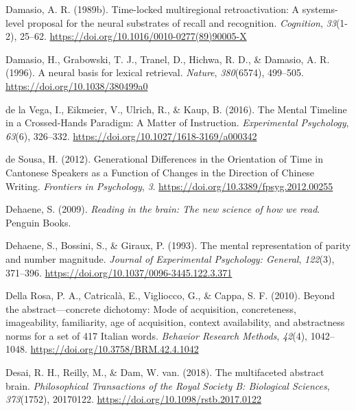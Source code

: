 \documentclass[
  a4paper,12pt,twoside,onecolumn,openright,final,oldfontcommands]{memoir}
\newlength{\cslhangindent}
\newlength{\cslentryspacingunit} %
\newenvironment{CSLReferences}[2] %
 {%
  \setlength{\parindent}{0pt}
  \ifodd #1
  \let\oldpar\par
  \def\par{\hangindent=\cslhangindent\oldpar}
  \fi
  \setlength{\parskip}{#2\cslentryspacingunit}
 }%
 {}
\begin{document}
\begin{CSLReferences}{1}{0}
\leavevmode{}%
Damasio, A. R. (1989b). Time-locked multiregional retroactivation: {A} systems-level proposal for the neural substrates of recall and recognition. \emph{Cognition}, \emph{33}(1-2), 25--62. \url{https://doi.org/10.1016/0010-0277(89)90005-X}

\leavevmode{}%
Damasio, H., Grabowski, T. J., Tranel, D., Hichwa, R. D., \& Damasio, A. R. (1996). A neural basis for lexical retrieval. \emph{Nature}, \emph{380}(6574), 499--505. \url{https://doi.org/10.1038/380499a0}

\leavevmode{}%
de la Vega, I., Eikmeier, V., Ulrich, R., \& Kaup, B. (2016). The {Mental} {Timeline} in a {Crossed}-{Hands} {Paradigm}: {A} {Matter} of {Instruction}. \emph{Experimental Psychology}, \emph{63}(6), 326--332. \url{https://doi.org/10.1027/1618-3169/a000342}

\leavevmode{}%
de Sousa, H. (2012). Generational {Differences} in the {Orientation} of {Time} in {Cantonese} {Speakers} as a {Function} of {Changes} in the {Direction} of {Chinese} {Writing}. \emph{Frontiers in Psychology}, \emph{3}. \url{https://doi.org/10.3389/fpsyg.2012.00255}

\leavevmode{}%
Dehaene, S. (2009). \emph{Reading in the brain: The new science of how we read}. Penguin Books.

\leavevmode{}%
Dehaene, S., Bossini, S., \& Giraux, P. (1993). The mental representation of parity and number magnitude. \emph{Journal of Experimental Psychology: General}, \emph{122}(3), 371--396. \url{https://doi.org/10.1037/0096-3445.122.3.371}

\leavevmode{}%
Della Rosa, P. A., Catricalà, E., Vigliocco, G., \& Cappa, S. F. (2010). Beyond the abstract---concrete dichotomy: {Mode} of acquisition, concreteness, imageability, familiarity, age of acquisition, context availability, and abstractness norms for a set of 417 {Italian} words. \emph{Behavior Research Methods}, \emph{42}(4), 1042--1048. \url{https://doi.org/10.3758/BRM.42.4.1042}

\leavevmode{}%
Desai, R. H., Reilly, M., \& Dam, W. van. (2018). The multifaceted abstract brain. \emph{Philosophical Transactions of the Royal Society B: Biological Sciences}, \emph{373}(1752), 20170122. \url{https://doi.org/10.1098/rstb.2017.0122}


\end{CSLReferences}
\end{document}
